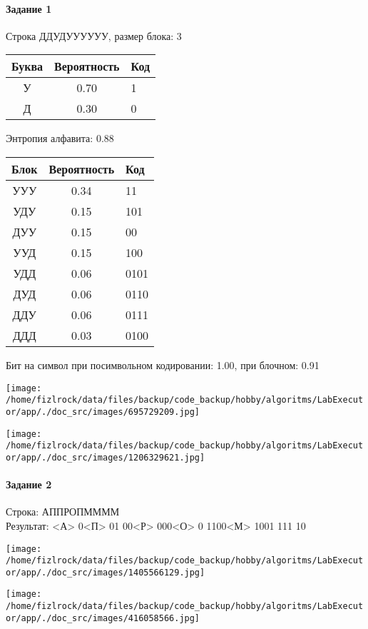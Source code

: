 \documentclass[a4paper, 12pt]{article}
\begin{document}
\paragraph{Задание 1}

Строка ДДУДУУУУУУ, размер блока: 3
\begin{center}
 \begin{tabular}{ |c|c|l| } 
  \hline
     Буква & Вероятность & Код\\ \hline
У & 0.70 & 1\\\hline
Д & 0.30 & 0
\\ \hline \end{tabular}
\end{center}
Энтропия алфавита: 0.88
\begin{center}
 \begin{tabular}{ |c|c|l| } 
  \hline
     Блок & Вероятность & Код\\ \hline
УУУ & 0.34 & 11\\\hline
УДУ & 0.15 & 101\\\hline
ДУУ & 0.15 & 00\\\hline
УУД & 0.15 & 100\\\hline
УДД & 0.06 & 0101\\\hline
ДУД & 0.06 & 0110\\\hline
ДДУ & 0.06 & 0111\\\hline
ДДД & 0.03 & 0100
\\ \hline \end{tabular}
\end{center}
Бит на символ при посимвольном кодировании: 1.00, при блочном: 0.91

\texttt{[image: /home/fizlrock/data/files/backup/code\_backup/hobby/algoritms/LabExecutor/app/./doc\_src/images/695729209.jpg]}

\texttt{[image: /home/fizlrock/data/files/backup/code\_backup/hobby/algoritms/LabExecutor/app/./doc\_src/images/1206329621.jpg]}
\pagebreak
\paragraph{Задание 2}

Строка: 
АППРОПММММ\\
Результат: <А> 0<П> 01 00<Р> 000<О> 0 1100<М> 1001 111 10

\texttt{[image: /home/fizlrock/data/files/backup/code\_backup/hobby/algoritms/LabExecutor/app/./doc\_src/images/1405566129.jpg]}

\texttt{[image: /home/fizlrock/data/files/backup/code\_backup/hobby/algoritms/LabExecutor/app/./doc\_src/images/416058566.jpg]}
\end{document}
